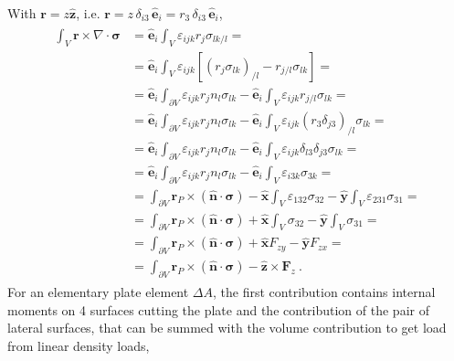 \documentclass[letterpaper,10pt,english]{jupyterBook}
\begin{document}
\sphinxAtStartPar
With \(\mathbf{r} = z \hat{\mathbf{z}}\), i.e. \(\mathbf{r} = z \, \delta_{i3} \, \hat{\mathbf{e}}_i = r_3 \, \delta_{i3} \, \hat{\mathbf{e}}_i \),
\begin{equation*}
\begin{split}\begin{aligned}
  \int_{V} \mathbf{r} \times \nabla \cdot \boldsymbol\sigma 
  & = \hat{\mathbf{e}}_i \int_{V} \varepsilon_{ijk} r_j \sigma_{lk/l} = \\
  & = \hat{\mathbf{e}}_i \int_{V} \varepsilon_{ijk} \left[  \left( r_j \sigma_{lk} \right)_{/l} - r_{j/l} \sigma_{lk} \right] = \\
  & = \hat{\mathbf{e}}_i \int_{\partial V} \varepsilon_{ijk} r_j n_l  \sigma_{lk} - \hat{\mathbf{e}}_i \int_{V} \varepsilon_{ijk} r_{j/l} \sigma_{lk} = \\
  & = \hat{\mathbf{e}}_i \int_{\partial V} \varepsilon_{ijk} r_j n_l  \sigma_{lk} - \hat{\mathbf{e}}_i \int_{V} \varepsilon_{ijk} \left( r_3 \delta_{j3} \right)_{/l} \sigma_{lk} = \\
  & = \hat{\mathbf{e}}_i \int_{\partial V} \varepsilon_{ijk} r_j n_l  \sigma_{lk} - \hat{\mathbf{e}}_i \int_{V} \varepsilon_{ijk} \delta_{l3} \delta_{j3} \sigma_{lk} = \\
  & = \hat{\mathbf{e}}_i \int_{\partial V} \varepsilon_{ijk} r_j n_l  \sigma_{lk} - \hat{\mathbf{e}}_i \int_{V} \varepsilon_{i3k} \sigma_{3k} = \\
  & = \int_{\partial V} \mathbf{r}_P \times ( \hat{\mathbf{n}} \cdot \boldsymbol\sigma ) - \hat{\mathbf{x}} \int_{V} \varepsilon_{132} \sigma_{32} - \hat{\mathbf{y}} \int_{V} \varepsilon_{231} \sigma_{31} = \\
  & = \int_{\partial V} \mathbf{r}_P \times ( \hat{\mathbf{n}} \cdot \boldsymbol\sigma ) + \hat{\mathbf{x}} \int_{V} \sigma_{32} - \hat{\mathbf{y}} \int_{V}  \sigma_{31} = \\
  & = \int_{\partial V} \mathbf{r}_P \times ( \hat{\mathbf{n}} \cdot \boldsymbol\sigma ) + \hat{\mathbf{x}} F_{zy} - \hat{\mathbf{y}} F_{zx} = \\
  & = \int_{\partial V} \mathbf{r}_P \times ( \hat{\mathbf{n}} \cdot \boldsymbol\sigma ) - \hat{\mathbf{z}} \times \mathbf{F}_z \ .
\end{aligned}\end{split}
\end{equation*}
\sphinxAtStartPar
For an elementary plate element \(\Delta A\), the first contribution contains internal moments on 4 surfaces cutting the plate and the contribution of the pair of lateral surfaces, that can be summed with the volume contribution to get load from linear density loads,
\end{document}
